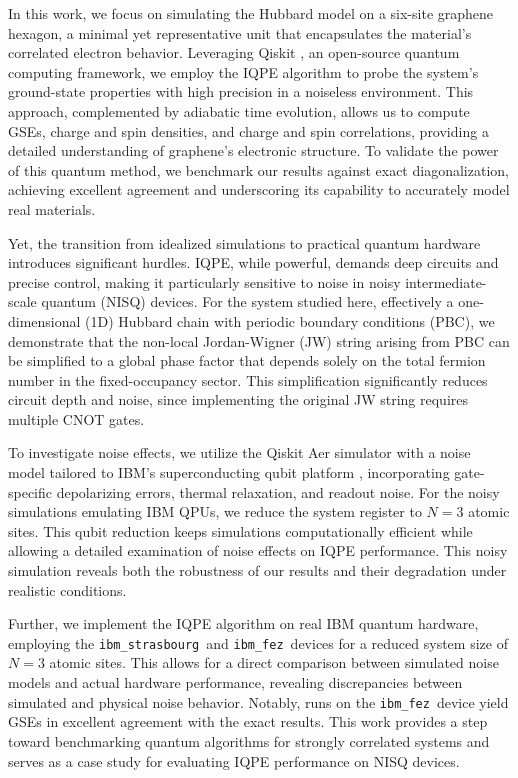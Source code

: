 \documentclass[twocolumn,superscriptaddress,amsmath,amssymb,showpacs,floatfix,preprintnumbers]{revtex4-1}
\newcommand{\ibmstr}{\texttt{ibm\_strasbourg}}
\newcommand{\ibmfez}{\texttt{ibm\_fez}}
\begin{document}
In this work, we focus on simulating the Hubbard model on a six-site graphene hexagon, a minimal
yet representative unit that encapsulates the material's correlated electron behavior. 
%
Leveraging Qiskit \cite{Qiskit}, an open-source quantum computing framework, we employ the IQPE 
algorithm to probe the system's ground-state properties with high precision in a noiseless environment. 
%
This approach, complemented by adiabatic time evolution, allows us to compute GSEs, charge and spin 
densities, and charge and spin correlations, providing a detailed understanding of 
graphene's electronic structure. 
%
To validate the power of this quantum method, we benchmark our results against exact
diagonalization, achieving excellent agreement and underscoring its capability 
to accurately model real materials.

Yet, the transition from idealized simulations to practical quantum hardware introduces significant
hurdles. 
%
IQPE, while powerful, demands deep circuits and precise control, making it particularly
sensitive to noise in noisy intermediate-scale quantum (NISQ) devices. 
%
For the system studied here, effectively a one-dimensional (1D) Hubbard chain with periodic boundary conditions (PBC), we demonstrate that the non-local Jordan-Wigner (JW) string arising from PBC can be simplified to a global phase factor that depends solely on the total fermion number in the fixed-occupancy sector.
%
This simplification significantly reduces circuit depth and noise, since 
implementing the original JW string requires multiple CNOT gates.

To investigate noise effects, we utilize the Qiskit Aer simulator \cite{Qis-Aer} with a 
noise model tailored to IBM's superconducting qubit platform \cite{IBM}, incorporating gate-specific 
depolarizing errors, thermal relaxation, and readout noise. 
%
For the noisy simulations emulating IBM QPUs, we reduce the system register to $N = 3$ atomic sites.
%
This qubit reduction keeps simulations computationally efficient while allowing a detailed examination of noise effects on IQPE performance.
%
This noisy simulation reveals both the robustness of our results and their degradation 
under realistic conditions. 

Further, we implement the IQPE algorithm on real IBM quantum hardware,
employing the \ibmstr\ and \ibmfez\ devices for a reduced system size of $N = 3$ atomic sites.
%
This allows for a direct comparison between simulated noise models and actual hardware performance,
revealing discrepancies between simulated and physical noise behavior.
%
Notably, runs on the \ibmfez\ device yield GSEs in excellent agreement with the exact results.
%
This work provides a step toward benchmarking quantum algorithms for strongly correlated systems and serves as a case study for evaluating IQPE performance on NISQ devices.
\end{document}
